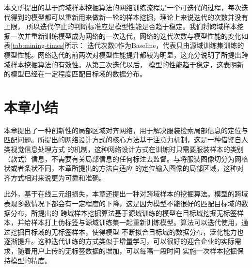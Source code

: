 本文所提出的基于跨域样本挖掘算法的网络训练流程是一个可迭代的过程，每次迭代得到的模型都可以重新用来做新一轮的样本挖掘，理论上来说迭代的次数并没有上限，
所以迭代停止的判断标准应是模型性能是否趋于稳定。我们将跨域样本挖掘一次并重新训练模型成为网络的一次迭代，网络的迭代次数与模型性能的变化如表\ref{tab:mining-times}所示：
迭代次数0作为Baseline，代表只由源域训练集训练的模型性能。网络迭代的前两次对模型性能提升都较为明显，这充分说明了所提出跨域样本挖掘算法的有效性。从第三次迭代以后，
模型的性能趋于稳定，这表明新的模型已经在一定程度匹配目标域的数据分布。
\section{本章小结}
本章提出了一种创新性的局部区域对齐网络，用于解决服装检索局部信息的定位与匹配问题。所提出的网络设计方式的核心方法基于注意力机制，这是一种借鉴自人类视觉信息处理方式
的机制，这种网络设计方式在训练时只需要服装样本的类别（款式）信息，不需要有关局部信息的任何标注去监督。与将服装图像切分为网格状或者条状不同，本章所提出的方法自适应
的定位输入图像的局部区域，这种对齐方式相对来说更为可靠和准确。

此外，基于在线三元组损失，本章还提出一种对跨域样本的挖掘算法。模型的跨域表现多数情况下都会有一定程度的下降，这是因为模型不能很好的匹配目标域的数据分布，所提出的
跨域样本挖掘算法基于源域训练的模型在目标域挖掘无标签样本，并给样本打上伪标签与源域训练集一起重新训练模型。算法可以迭代使用，通过挖掘目标域的无标签样本，使得模型
不断拟合目标域的数据分布，泛化能力也逐渐提升。这种迭代训练的方式类似于增量学习，可以很好的迎合企业的实际需求，随着用户上传的无标签数据的增加，可以每隔一段时间
实施一次样本挖掘保持模型的精度。
